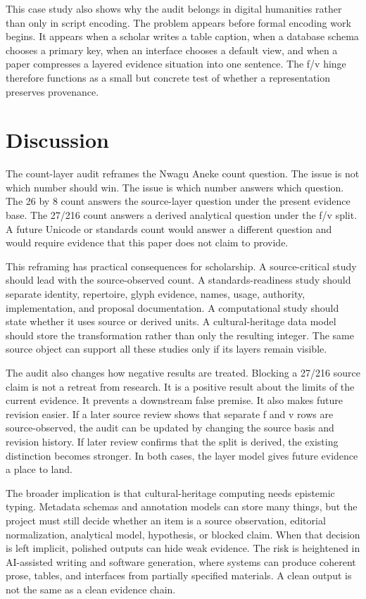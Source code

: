 \documentclass[sigconf,nonacm]{acmart}
\begin{document}
This case study also shows why the audit belongs in digital humanities rather
than only in script encoding. The problem appears before formal encoding work
begins. It appears when a scholar writes a table caption, when a database schema
chooses a primary key, when an interface chooses a default view, and when a
paper compresses a layered evidence situation into one sentence. The f/v hinge
therefore functions as a small but concrete test of whether a representation
preserves provenance.

\section{Discussion}
The count-layer audit reframes the Nwagu Aneke count question. The issue is not
which number should win. The issue is which number answers which question. The
26 by 8 count answers the source-layer question under the present evidence
base. The 27/216 count answers a derived analytical question under the f/v
split. A future Unicode or standards count would answer a different question
and would require evidence that this paper does not claim to provide.

This reframing has practical consequences for scholarship. A source-critical
study should lead with the source-observed count. A standards-readiness study
should separate identity, repertoire, glyph evidence, names, usage, authority,
implementation, and proposal documentation. A computational study should state
whether it uses source or derived units. A cultural-heritage data model should
store the transformation rather than only the resulting integer. The same
source object can support all these studies only if its layers remain visible.

The audit also changes how negative results are treated. Blocking a 27/216
source claim is not a retreat from research. It is a positive result about the
limits of the current evidence. It prevents a downstream false premise. It also
makes future revision easier. If a later source review shows that separate f
and v rows are source-observed, the audit can be updated by changing the source
basis and revision history. If later review confirms that the split is derived,
the existing distinction becomes stronger. In both cases, the layer model gives
future evidence a place to land.

The broader implication is that cultural-heritage computing needs epistemic
typing. Metadata schemas and annotation models can store many things, but the
project must still decide whether an item is a source observation, editorial
normalization, analytical model, hypothesis, or blocked claim. When that
decision is left implicit, polished outputs can hide weak evidence. The risk is
heightened in AI-assisted writing and software generation, where systems can
produce coherent prose, tables, and interfaces from partially specified
materials. A clean output is not the same as a clean evidence chain.
\end{document}
